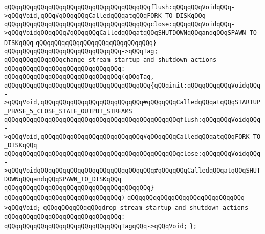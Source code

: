 \verb|qQQqqQQqqQQqqQQqqQQqqQQqqQQqqQQqqQQqqQQqflush:qQQqqQQqVoidqQQq->qQQqVoid,qQQq#qQQqqQQqCalledqQQqatqQQqFORK_TO_DISKqQQq|\newline
\verb|qQQqqQQqqQQqqQQqqQQqqQQqqQQqqQQqqQQqqQQqclose:qQQqqQQqVoidqQQq->qQQqVoidqQQqqQQq#qQQqqQQqCalledqQQqatqQQqSHUTDOWNqQQqandqQQqSPAWN_TO_DISKqQQq|\newline
\verb|qQQqqQQqqQQqqQQqqQQqqQQqqQQqqQQq}|\newline
\verb|qQQqqQQqqQQqqQQqqQQqqQQqqQQqqQQq->qQQqTag;|\newline
\newline
\verb|qQQqqQQqqQQqqQQqchange_stream_startup_and_shutdown_actions|\newline
\verb|qQQqqQQqqQQqqQQqqQQqqQQqqQQqqQQq:|\newline
\verb|qQQqqQQqqQQqqQQqqQQqqQQqqQQqqQQq(qQQqTag,|\newline
\verb|qQQqqQQqqQQqqQQqqQQqqQQqqQQqqQQqqQQqqQQq{qQQqinit:qQQqqQQqqQQqVoidqQQq->qQQqVoid,qQQqqQQqqQQqqQQqqQQqqQQqqQQq#qQQqqQQqCalledqQQqatqQQqSTARTUP_PHASE_5_CLOSE_STALE_OUTPUT_STREAMS|\newline
\verb|qQQqqQQqqQQqqQQqqQQqqQQqqQQqqQQqqQQqqQQqqQQqqQQqflush:qQQqqQQqVoidqQQq->qQQqVoid,qQQqqQQqqQQqqQQqqQQqqQQqqQQq#qQQqqQQqCalledqQQqatqQQqFORK_TO_DISKqQQq|\newline
\verb|qQQqqQQqqQQqqQQqqQQqqQQqqQQqqQQqqQQqqQQqqQQqqQQqclose:qQQqqQQqVoidqQQq->qQQqVoidqQQqqQQqqQQqqQQqqQQqqQQqqQQqqQQq#qQQqqQQqCalledqQQqatqQQqSHUTDOWNqQQqandqQQqSPAWN_TO_DISKqQQq|\newline
\verb|qQQqqQQqqQQqqQQqqQQqqQQqqQQqqQQqqQQqqQQq}|\newline
\verb|qQQqqQQqqQQqqQQqqQQqqQQqqQQqqQQq)|\newline
\verb|qQQqqQQqqQQqqQQqqQQqqQQqqQQqqQQq->qQQqVoid;|\newline
\newline
\verb|qQQqqQQqqQQqqQQqdrop_stream_startup_and_shutdown_actions|\newline
\verb|qQQqqQQqqQQqqQQqqQQqqQQqqQQqqQQq:|\newline
\verb|qQQqqQQqqQQqqQQqqQQqqQQqqQQqqQQqTagqQQq->qQQqVoid;|\newline
\newline
\verb|};|\newline
\newline
\newline
\newline

